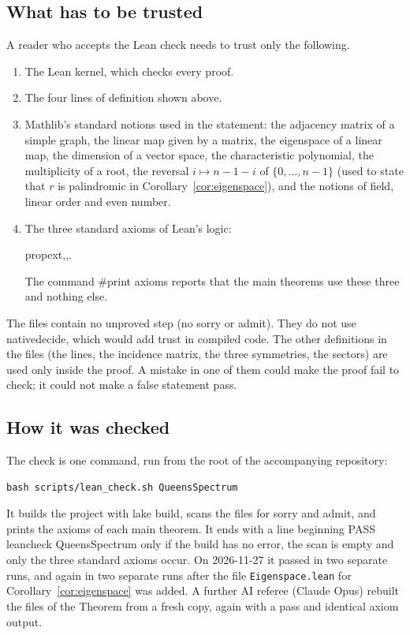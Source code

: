 \documentclass[11pt]{amsart}
\theoremstyle{plain}
\theoremstyle{definition}
\theoremstyle{remark}
\numberwithin{equation}{section}
\newcommand{\leanus}{\textunderscore\allowbreak}
\newcommand{\lean}[1]{{\ttfamily\let\_\leanus #1}}  %
\begin{document}
\subsection{What has to be trusted}
A reader who accepts the Lean check needs to trust only the following.
\begin{enumerate}
\item The Lean kernel, which checks every proof.
\item The four lines of definition shown above.
\item Mathlib's standard notions used in the statement: the adjacency matrix of a
simple graph, the linear map given by a matrix, the eigenspace of a linear map, the
dimension of a vector space, the characteristic polynomial, the multiplicity of a root,
the reversal \(i\mapsto n-1-i\) of \(\{0,\dots,n-1\}\) (used to state that \(r\) is
palindromic in Corollary~\ref{cor:eigenspace}), and the notions of field, linear order
and even number.
\item The three standard axioms of Lean's logic:
\begin{center}
\lean{propext},\qquad \lean{Classical.choice},\qquad \lean{Quot.sound}.
\end{center}
The command \lean{\#print axioms} reports that the main theorems use these three and
nothing else.
\end{enumerate}
The files contain no unproved step (no \lean{sorry} or \lean{admit}). They
do not use \lean{native\_decide}, which would add trust in compiled code. The other
definitions in the files (the lines, the incidence matrix, the three symmetries, the
sectors) are used only inside the proof. A mistake in one of them could make the proof
fail to check; it could not make a false statement pass.

\subsection{How it was checked}
The check is one command, run from the root of the accompanying repository:
\begin{verbatim}
bash scripts/lean_check.sh QueensSpectrum
\end{verbatim}
It builds the project with \lean{lake build}, scans the files for
\lean{sorry} and \lean{admit}, and prints the axioms of each main theorem.
It ends with a line beginning \lean{PASS lean\_check QueensSpectrum} only if the
build has no error, the scan is empty and only the three standard axioms occur. On
2026-11-27 it passed in two separate runs, and again in two separate runs after the file
\nolinkurl{Eigenspace.lean} for Corollary~\ref{cor:eigenspace} was added. A further AI
referee (Claude Opus) rebuilt the files of the Theorem from a fresh copy, again with a
pass and identical axiom output.
\end{document}
